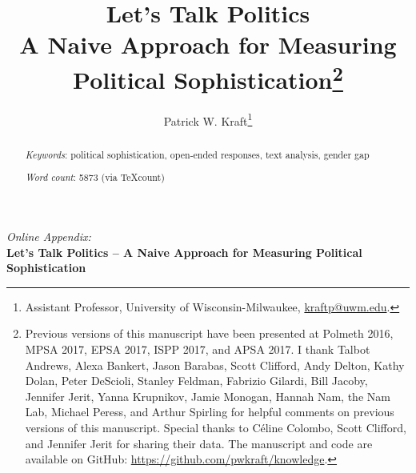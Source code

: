 \documentclass[12pt]{article}
\author{Patrick W. Kraft\footnote{Assistant Professor, University of Wisconsin-Milwaukee, \href{mailto:kraftp@uwm.edu}{kraftp@uwm.edu}.}}
\title{Let's Talk Politics\\
\large{A Naive Approach for Measuring Political Sophistication}\footnote{Previous versions of this manuscript have been presented at Polmeth 2016, MPSA 2017, EPSA 2017, ISPP 2017, and APSA 2017. I thank Talbot Andrews, Alexa Bankert, Jason Barabas, Scott Clifford, Andy Delton, Kathy Dolan, Peter DeScioli, Stanley Feldman, Fabrizio Gilardi, Bill Jacoby, Jennifer Jerit, Yanna Krupnikov, Jamie Monogan, Hannah Nam, the Nam Lab, Michael Peress, and Arthur Spirling for helpful comments on previous versions of this manuscript. Special thanks to C{\'e}line Colombo, Scott Clifford, and Jennifer Jerit for sharing their data. The manuscript and code are available on GitHub: \url{https://github.com/pwkraft/knowledge}.
}
}
\date{}
\begin{document}
\maketitle
\doublespacing
\thispagestyle{empty}


\hfill
\begin{abstract}\singlespacing
\noindent 


\vspace{\baselineskip}
\noindent \textit{Keywords}: political sophistication, open-ended responses, text analysis, gender gap

\vspace{\baselineskip}
\noindent \textit{Word count}: 5873 (via TeXcount)
\end{abstract}
\hfill

\newpage\setcounter{page}{1}


\clearpage
\singlespacing



\clearpage
\renewcommand\thesubsection{\Roman{subsection}}
\setcounter{page}{1}
\appendices
\textit{Online Appendix:}\\
\textbf{Let's Talk Politics -- A Naive Approach for Measuring Political Sophistication}

\startcontents[sections]
\clearpage


\end{document}

